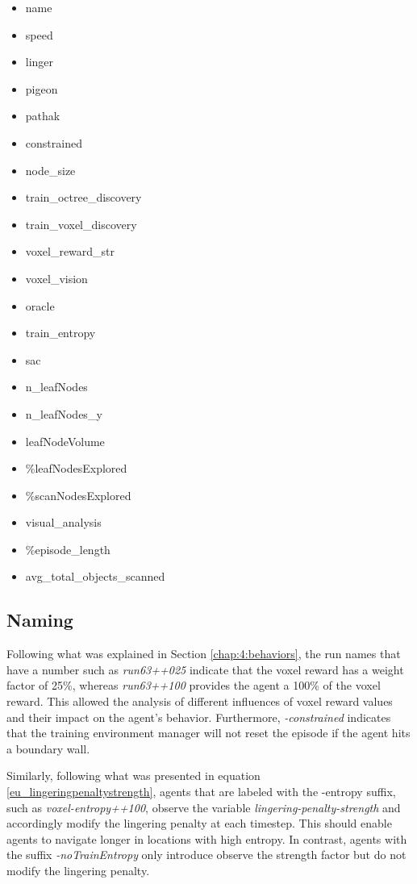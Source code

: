    \begin{multicols}{3}
\begin{itemize}
    \item name
    \item speed
    \item linger
    \item pigeon
    \item pathak
    \item constrained
    \item node\_size
    \item train\_octree\_discovery
    \item train\_voxel\_discovery
    \item voxel\_reward\_str
    \item voxel\_vision
    \item oracle
    \item train\_entropy
    \item sac
    \item n\_leafNodes
    \item n\_leafNodes\_y
    \item leafNodeVolume
    \item \%leafNodesExplored
    \item \%scanNodesExplored
    \item visual\_analysis %
    \item \%episode\_length
    \item avg\_total\_objects\_scanned
\end{itemize}
\end{multicols}


\subsection{Naming}

Following what was explained in Section \ref{chap:4:behaviors}, the run names that have a number such as \textit{run63++025} indicate that the voxel reward has a weight factor of 25\%, whereas \textit{run63++100} provides the agent a 100\% of the voxel reward. This allowed the analysis of different influences of voxel reward values and their impact on the agent's behavior. Furthermore, \textit{-constrained} indicates that the training environment manager will not reset the episode if the agent hits a boundary wall.

Similarly, following what was presented in equation \ref{eu_lingeringpenaltystrength}, agents that are labeled with the -entropy suffix, such as \textit{voxel-entropy++100}, observe the variable \textit{lingering-penalty-strength} and accordingly modify the lingering penalty at each timestep. This should enable agents to navigate longer in locations with high entropy. In contrast, agents with the suffix \textit{-noTrainEntropy} only introduce observe the strength factor but do not modify the lingering penalty. 

